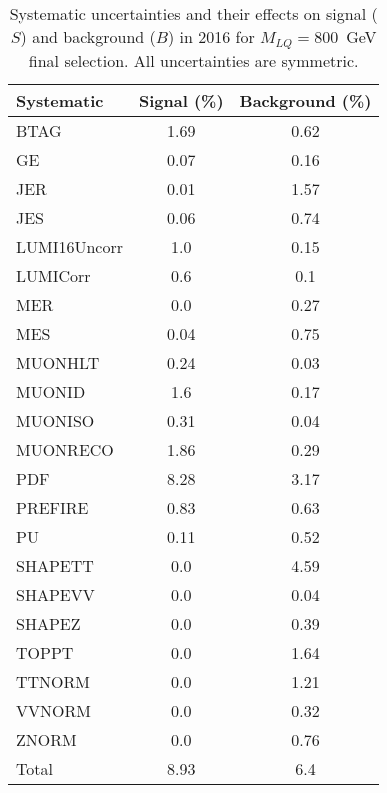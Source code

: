 \begin{table}[htbp]
\begin{center}
\caption{Systematic uncertainties and their effects on signal ($S$) and background ($B$) in 2016 for $M_{LQ}=800$~GeV final selection. All uncertainties are symmetric.}
\begin{tabular}{lcc}
\hline\hline
Systematic & Signal (\%) & Background (\%) \\ \hline 
BTAG & 1.69 & 0.62\\ 
GE & 0.07 & 0.16\\ 
JER & 0.01 & 1.57\\ 
JES & 0.06 & 0.74\\ 
LUMI16Uncorr & 1.0 & 0.15\\ 
LUMICorr & 0.6 & 0.1\\ 
MER & 0.0 & 0.27\\ 
MES & 0.04 & 0.75\\ 
MUONHLT & 0.24 & 0.03\\ 
MUONID & 1.6 & 0.17\\ 
MUONISO & 0.31 & 0.04\\ 
MUONRECO & 1.86 & 0.29\\ 
PDF & 8.28 & 3.17\\ 
PREFIRE & 0.83 & 0.63\\ 
PU & 0.11 & 0.52\\ 
SHAPETT & 0.0 & 4.59\\ 
SHAPEVV & 0.0 & 0.04\\ 
SHAPEZ & 0.0 & 0.39\\ 
TOPPT & 0.0 & 1.64\\ 
TTNORM & 0.0 & 1.21\\ 
VVNORM & 0.0 & 0.32\\ 
ZNORM & 0.0 & 0.76\\ 
Total & 8.93 & 6.4\\ \hline \hline
\end{tabular}
\label{tab:SysUncertainties_uujj_800}
\end{center}
\end{table}

